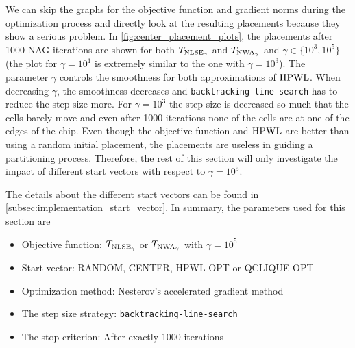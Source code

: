 We can skip the graphs for the objective function and gradient norms during the optimization process
and directly look at the resulting placements
because they show a serious problem.
In \cref{fig:center_placement_plots}, the placements after 1000 NAG iterations are shown
for both \(T_{\operatorname{NLSE}_\gamma}\) and \(T_{\operatorname{NWA}_\gamma}\) and \(\gamma \in \{10^3, 10^5\}\)
(the plot for \(\gamma = 10^1\) is extremely similar to the one with \(\gamma = 10^3\)).
The parameter \(\gamma\) controls the smoothness for both approximations of \(\operatorname{HPWL}\).
When decreasing \(\gamma\), the smoothness decreases and 
\texttt{backtracking-line-search} has to reduce the step size more.
For \(\gamma = 10^3\) the step size is decreased so much that the cells barely move and 
even after 1000 iterations none of the cells are at one of the edges of the chip.
Even though the objective function and \(\operatorname{HPWL}\) are better
than using a random initial placement,
the placements are useless in guiding a partitioning process.
Therefore, the rest of this section will only investigate the impact of different
start vectors with respect to \(\gamma = 10^5\).

The details about the different start vectors can be found in \cref{subsec:implementation_start_vector}.
In summary, the parameters used for this section are
\begin{itemize}
 \item Objective function: \(T_{\operatorname{NLSE}_\gamma}\) or \(T_{\operatorname{NWA}_\gamma}\) with \(\gamma = 10^5\)
 \item Start vector: RANDOM, CENTER, HPWL-OPT or QCLIQUE-OPT
 \item Optimization method: Nesterov's accelerated gradient method
 \item The step size strategy: \texttt{backtracking-line-search}
 \item The stop criterion: After exactly 1000 iterations
\end{itemize}

